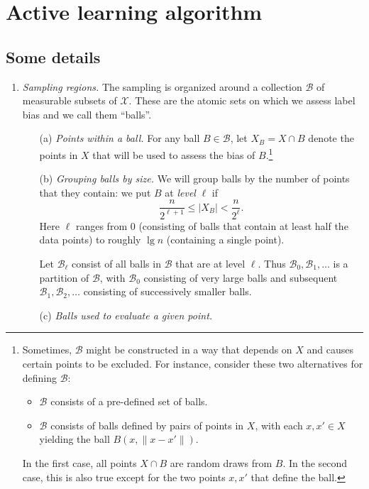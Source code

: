 \documentclass{article}
\def\X{{\mathcal X}}
\def\B{{\mathcal B}}
\begin{document}
\section{Active learning algorithm}

\subsection{Some details}

\begin{enumerate}

\item {\it Sampling regions.}
The sampling is organized around a collection $\B$ of measurable subsets of $\X$. These are the atomic sets on which we assess label bias and we call them ``balls''.

\begin{enumerate}

\item[(a)] {\it Points within a ball.} For any ball $B \in \B$, let $X_B = X \cap B$ denote the points in $X$ that will be used to assess the bias of $B$.\footnote{Sometimes, $\B$ might be constructed in a way that depends on $X$ and causes certain points to be excluded. For instance, consider these two alternatives for defining $\B$:
\begin{itemize}
\item $\B$ consists of a pre-defined set of balls.
\item $\B$ consists of balls defined by pairs of points in $X$, with each $x,x' \in X$ yielding the ball $B(x,\|x-x'\|)$.
\end{itemize}
In the first case, all points $X \cap B$ are random draws from $B$. In the second case, this is also true except for the two points $x,x'$ that define the ball.}

\item[(b)] {\it Grouping balls by size.} We will group balls by the number of points that they contain: we put $B$ at {\it level} $\ell$ if
$$ \frac{n}{2^{\ell + 1}} \leq |X_B| < \frac{n}{2^\ell} .$$
Here $\ell$ ranges from $0$ (consisting of balls that contain at least half the data points) to roughly $\lg n$ (containing a single point). 

Let $\B_\ell$ consist of all balls in $\B$ that are at level $\ell$. Thus $\B_0, \B_1, \ldots$ is a partition of $\B$, with $\B_0$ consisting of very large balls and subsequent $\B_1, \B_2, \ldots$ consisting of successively smaller balls.

\item[(c)] {\it Balls used to evaluate a given point.}


\end{enumerate}
\end{enumerate}
\end{document}
